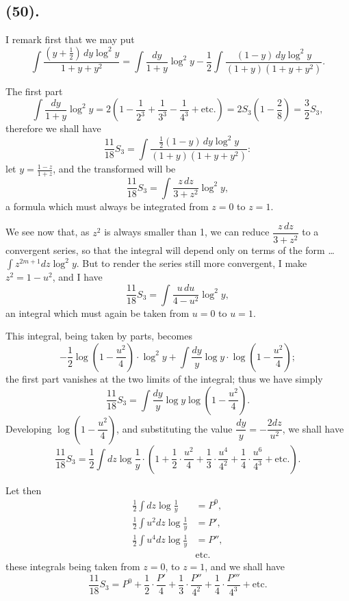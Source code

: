 \documentclass{article}
\begin{document}
\subsection*{(50).}

I remark first that we may put
\[ \int\frac{(y+\frac{1}{2})\,dy\log^{2}y}{1+y+y^{2}}=\int\frac{dy}{1+y}\log^{2}y-\frac{1}{2}\int\frac{(1-y)\,dy\log^{2}y}{(1+y)(1+y+y^{2})}. \]

The first part
\[ \int\frac{dy}{1+y}\log^{2}y=2\left(1-\frac{1}{2^{3}}+\frac{1}{3^{3}}-\frac{1}{4^{3}}+\text{etc.}\right)=2S_{3}\left(1-\frac{2}{8}\right)=\frac{3}{2}S_{3}, \]
therefore we shall have
\[ \frac{11}{18}S_{3}=\int\frac{\frac{1}{2}(1-y)\,dy\log^{2}y}{(1+y)(1+y+y^{2})}: \]
let $y=\frac{1-z}{1+z}$, and the transformed will be
\[ \frac{11}{18}S_{3}=\int\frac{z\,dz}{3+z^{2}}\log^{2}y, \]
a formula which must always be integrated from $z=0$ to $z=1$.

We see now that, as $z^{2}$ is always smaller than 1, we can reduce $\dfrac{z\,dz}{3+z^{2}}$ to a convergent series, so that the integral will depend only on terms of the form \ldots\ $\displaystyle\int z^{2m+1}dz\log^{2}y$. But to render the series still more convergent, I make $z^{2}=1-u^{2}$, and I have
\[ \frac{11}{18}S_{3}=\int\frac{u\,du}{4-u^{2}}\log^{2}y, \]
an integral which must again be taken from $u=0$ to $u=1$.

This integral, being taken by parts, becomes
\[ -\frac{1}{2}\log\left(1-\frac{u^{2}}{4}\right)\cdot\log^{2}y+\int\frac{dy}{y}\log y\cdot\log\left(1-\frac{u^{2}}{4}\right); \]
the first part vanishes at the two limits of the integral; thus we have simply
\[ \frac{11}{18}S_{3}=\int\frac{dy}{y}\log y\log\left(1-\frac{u^{2}}{4}\right). \]
Developing $\log\left(1-\dfrac{u^{2}}{4}\right)$, and substituting the value $\dfrac{dy}{y}=-\dfrac{2dz}{u^{2}}$, we shall have
\[ \frac{11}{18}S_{3}=\frac{1}{2}\int dz\log\frac{1}{y}\cdot\left(1+\frac{1}{2}\cdot\frac{u^{2}}{4}+\frac{1}{3}\cdot\frac{u^{4}}{4^{2}}+\frac{1}{4}\cdot\frac{u^{6}}{4^{3}}+\text{etc.}\right). \]

Let then
\[ \begin{aligned} \frac{1}{2}\int dz\log\frac{1}{y}&=P^{0},\\ \frac{1}{2}\int u^{2}dz\log\frac{1}{y}&=P',\\ \frac{1}{2}\int u^{4}dz\log\frac{1}{y}&=P'',\\ &\text{etc.} \end{aligned} \]
these integrals being taken from $z=0$, to $z=1$, and we shall have
\[ \frac{11}{18}S_{3}=P^{0}+\frac{1}{2}\cdot\frac{P'}{4}+\frac{1}{3}\cdot\frac{P''}{4^{2}}+\frac{1}{4}\cdot\frac{P'''}{4^{3}}+\text{etc.} \]
\end{document}
